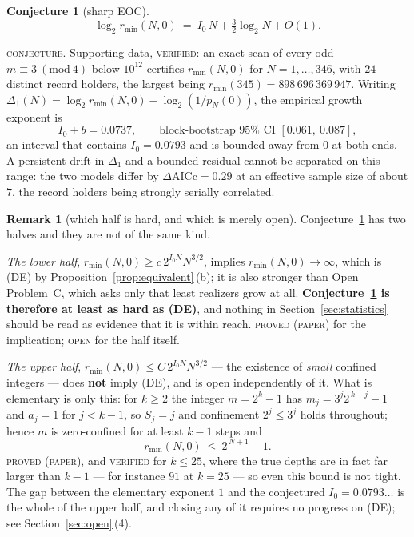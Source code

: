 \documentclass[11pt,reqno]{amsart}
\theoremstyle{plain}
\newtheorem{conjecture}[theorem]{Conjecture}
\theoremstyle{definition}
\newtheorem{remark}[theorem]{Remark}
\newcommand{\lab}[1]{\textnormal{\textsc{\small #1}}}
\begin{document}
\begin{conjecture}[sharp EOC]\label{conj:sharp}
\[
\log_2 r_{\min}(N,0)\ =\ I_0\,N+\tfrac32\log_2 N+O(1).
\]
\end{conjecture}
\lab{conjecture}. Supporting data, \lab{verified}: an exact scan of every odd
$m\equiv3\ (\mathrm{mod}\ 4)$ below $10^{12}$ certifies $r_{\min}(N,0)$ for
$N=1,\dots,346$, with $24$ distinct record holders, the largest being
$r_{\min}(345)=898\,696\,369\,947$. Writing
$\Delta_1(N)=\log_2 r_{\min}(N,0)-\log_2(1/p_N(0))$, the empirical growth exponent
is
\[
I_0+b=0.0737,\qquad\text{block-bootstrap }95\%\text{ CI }[0.061,\ 0.087],
\]
an interval that contains $I_0=0.0793$ and is bounded away from $0$ at both ends.
A persistent drift in $\Delta_1$ and a bounded residual cannot be separated on
this range: the two models differ by $\Delta\mathrm{AICc}=0.29$ at an effective
sample size of about $7$, the record holders being strongly serially correlated.

\begin{remark}[which half is hard, and which is merely open]\label{rem:halves}
Conjecture~\ref{conj:sharp} has two halves and they are not of the same kind.

\emph{The lower half}, $r_{\min}(N,0)\ge c\,2^{I_0N}N^{3/2}$, implies
$r_{\min}(N,0)\to\infty$, which is \textup{(DE)} by
Proposition~\ref{prop:equivalent}\,(b); it is also stronger than Open Problem~C,
which asks only that least realizers grow at all. \textbf{Conjecture~\ref{conj:sharp}
is therefore at least as hard as \textup{(DE)}}, and nothing in
Section~\ref{sec:statistics} should be read as evidence that it is within reach.
\lab{proved (paper)} for the implication; \lab{open} for the half itself.

\emph{The upper half}, $r_{\min}(N,0)\le C\,2^{I_0N}N^{3/2}$ --- the existence of
\emph{small} confined integers --- does \textbf{not} imply \textup{(DE)}, and is
open independently of it. What is elementary is only this: for $k\ge2$ the integer
$m=2^{k}-1$ has $m_j=3^{j}2^{\,k-j}-1$ and $a_j=1$ for $j<k-1$, so $S_j=j$ and
confinement $2^{j}\le 3^{j}$ holds throughout; hence $m$ is zero-confined for at
least $k-1$ steps and
\[
r_{\min}(N,0)\ \le\ 2^{\,N+1}-1 .
\]
\lab{proved (paper)}, and \lab{verified} for $k\le 25$, where the true depths are in fact
far larger than $k-1$ --- for instance $91$ at $k=25$ --- so even this bound is not
tight. The gap between the elementary exponent $1$ and the conjectured
$I_0=0.0793\ldots$ is the whole of the upper half, and closing any of it requires
no progress on \textup{(DE)}; see Section~\ref{sec:open}\,(4).
\end{remark}
\end{document}
